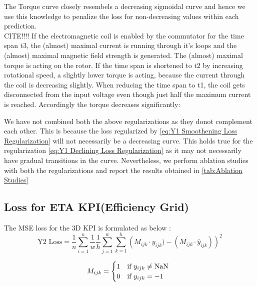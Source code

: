 \documentclass{report} %
\begin{document}
\begin{enumerate}
    The Torque curve closely resembels a decreasing sigmoidal curve and hence we use this knowledge to penalize the loss for non-decreasing values within each prediction. \\
CITE!!!!
If the electromagnetic coil is enabled by the commutator for the time span t3, the (almost) maximal current is running through it's loops and the (almost) maximal magnetic field strength is generated. The (almost) maximal torque is acting on the rotor. If the time span is shortened to t2 by increasing rotational speed, a slightly lower torque is acting, because the current through the coil is decreasing slightly. When reducing the time span to t1, the coil gets disconnected from the input voltage even though just half the maximum current is reached. Accordingly the torque decreases significantly:

\end{enumerate}

We have not combined both the above regularizations as they donot complement each other. This is because the loss regularized by \ref{eq:Y1 Smoothening Loss Regularization} will not necessarily be a decreasing curve.
This holds true for the regularization \ref{eq:Y1 Declining Loss Regularization} as it may not necessarily have gradual transitions in the curve.
Nevertheless, we perform ablation studies with both the regularizations and report the results obtained in \ref{tab:Ablation Studies}

\subsection{Loss for ETA \ac{KPI}(Efficiency Grid)}\label{sec:Loss for 3D KPI}

The \ac{MSE} loss for the \ac{3D} \ac{KPI} is formulated as below :
\begin{equation}
\text{Y2 Loss} = \frac{1}{n} \sum_{i=1}^{n} \frac{1}{w} \frac{1}{h} \sum_{j=1}^{w} \sum_{k=1}^{h} \left( M_{ijk} \cdot y_{ijk}) - (M_{ijk} \cdot \hat{y}_{ijk})\right)^2
\label{eq:Y2 Loss}
\end{equation}

\begin{equation}
    M_{ijk} = \begin{cases}
        1 & \text{if } y_{ijk} \neq \text{NaN } \\
        0 & \text{if } y_{ijk} = -1
        \end{cases} \\
\label{eq:Mask matrix}
\end{equation}
\end{document}
